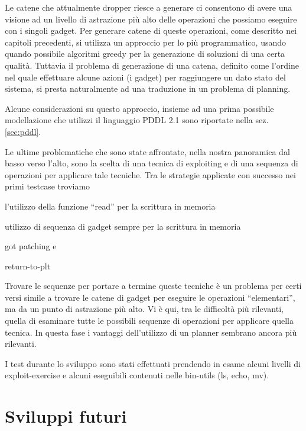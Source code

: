 Le catene che attualmente dropper riesce a generare ci consentono di
avere una visione ad un livello di astrazione più alto delle
operazioni che possiamo eseguire con i singoli gadget. Per generare
catene di queste operazioni, come descritto nei capitoli precedenti,
si utilizza un approccio per lo più programmatico, usando quando
possibile algoritmi greedy per la generazione di soluzioni di una
certa qualità. Tuttavia il problema di generazione di una catena,
definito come l'ordine nel quale effettuare alcune azioni (i gadget)
per raggiungere un dato stato del sistema, si presta naturalmente ad
una traduzione in un problema di planning.

Alcune considerazioni su questo approccio, insieme ad una prima
possibile modellazione che utilizzi il linguaggio PDDL 2.1
\cite{pddl-97,fox-03} sono riportate nella sez. \ref{sec:pddl}.

Le ultime problematiche che sono state affrontate, nella nostra
panoramica dal basso verso l'alto, sono la scelta di una tecnica di
exploiting e di una sequenza di operazioni per applicare tale
tecniche. Tra le strategie applicate con successo nei primi testcase
troviamo
\begin{inparaenum}[1)]
\item l'utilizzo della funzione ``read'' per la scrittura in memoria
\item utilizzo di sequenza di gadget sempre per la  scrittura in memoria
\item got patching e
\item return-to-plt
\end{inparaenum}

Trovare le sequenze per portare a termine queste tecniche è un
problema per certi versi simile a trovare le catene di gadget per
eseguire le operazioni ``elementari'', ma da un punto di astrazione
più alto.  Vi è qui, tra le difficoltà più rilevanti, quella di
esaminare tutte le possibili sequenze di operazioni per applicare
quella tecnica. In questa fase i vantaggi dell'utilizzo di un planner
sembrano ancora più rilevanti.

I test durante lo sviluppo sono stati effettuati prendendo in esame
alcuni livelli di exploit-exercise\cite{exploit-exercise} e alcuni
eseguibili contenuti nelle bin-utils (ls, echo, mv).

\section{Sviluppi futuri}

